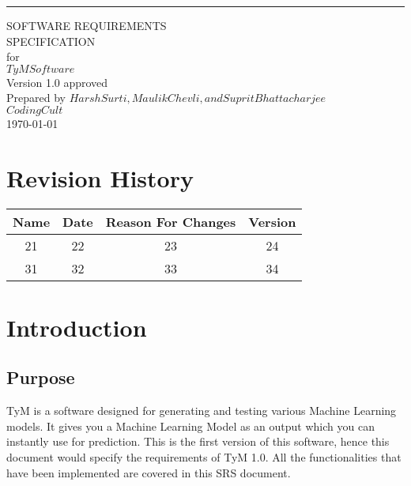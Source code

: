 \documentclass{scrreprt}
\date{}
\def\myversion{1.0 }
\begin{document}
\begin{flushright}
    \rule{16cm}{5pt}\vskip1cm
    \begin{bfseries}
        \Huge{SOFTWARE REQUIREMENTS\\ SPECIFICATION}\\
        \vspace{1.9cm}
        for\\
        \vspace{1.9cm}
        $TyM Software$\\
        \vspace{1.9cm}
        \LARGE{Version \myversion approved}\\
        \vspace{1.9cm}
        Prepared by $Harsh Surti, Maulik Chevli, and Suprit Bhattacharjee$\\
        \vspace{1.9cm}
        $Coding Cult$\\
        \vspace{1.9cm}
        \today\\
    \end{bfseries}
\end{flushright}

\tableofcontents


\chapter*{Revision History}

\begin{center}
    \begin{tabular}{|c|c|c|c|}
        \hline
	    Name & Date & Reason For Changes & Version\\
        \hline
	    21 & 22 & 23 & 24\\
        \hline
	    31 & 32 & 33 & 34\\
        \hline
    \end{tabular}
\end{center}

\chapter{Introduction}

\section{Purpose}
TyM is a software designed for generating and testing various Machine Learning models. It gives you a Machine Learning Model as an output which you can instantly use for prediction. This is the first version of this software, hence this document would specify the requirements of TyM 1.0. All the functionalities that have been implemented are covered in this SRS document.
\end{document}
